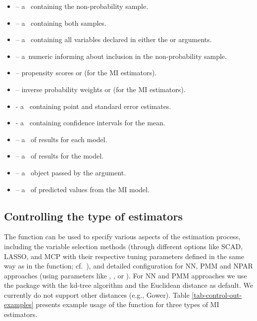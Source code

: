 \documentclass[nojss]{jss}
\begin{document}
\begin{itemize}
\item {} -- a~ containing the non-probability sample.
\item {} -- a~ containing both samples.
\item {} -- a~ containing all variables declared in either the  or  arguments.
\item {} -- a~numeric  informing about inclusion in the non-probability sample.
\item {} -- propensity scores or  (for the MI estimators).
\item {} -- inverse probability weights or  (for the MI estimators).
\item {} - a~ containing point and standard error estimates.
\item {} - a~ containing confidence intervals for the mean.
\item {} -- a~ of results for each  model.
\item {} -- a~ of results for the  model.
\item {} -- a~ object passed by the  argument.
\item {} -- a~ of predicted values from the MI model.
\end{itemize}

\subsection{Controlling the type of
estimators}\label{controlling-the-type-of-estimators}

The  function can be used to specify various aspects
of the estimation process, including the variable selection methods
(through different  options like SCAD, LASSO, and MCP with
their respective tuning parameters defined in the same way as in the
 function; cf.~\citet{yang_doubly_2020}), and
detailed configuration for NN, PMM and NPAR approaches (using parameters
like , ,  or
). For NN and PMM approaches we use the 
package \citep{rann-pkg} with the kd-tree algorithm and the Euclidean
distance as default. We currently do not support other distances (e.g.,
Gower). Table \ref{tab-control-out-examples} presents example usage of
the  function for three types of MI estimators.
\end{document}
